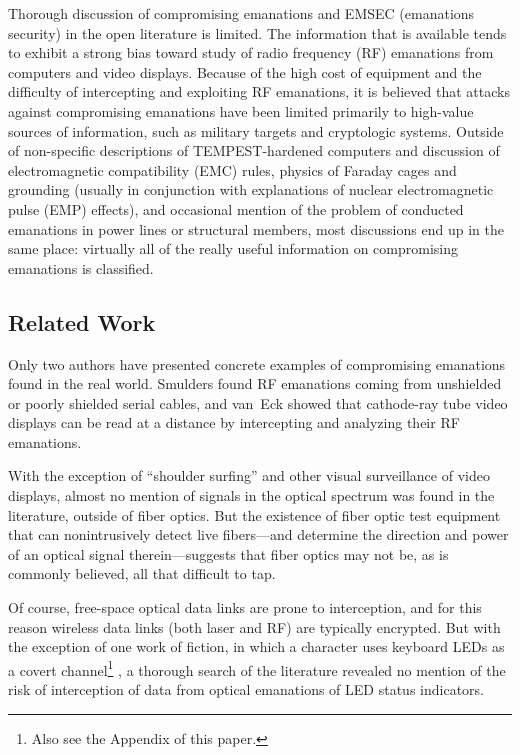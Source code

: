 \documentclass[twocolumn]{article}
\begin{document}
Thorough discussion of compromising emanations and EMSEC (emanations security) in the open literature is limited.  The information that is available tends to exhibit a strong bias toward study of radio frequency (RF) emanations from computers and video displays.  Because of the high cost of equipment and the difficulty of intercepting and exploiting RF emanations, it is believed that attacks against compromising emanations have been limited primarily to high-value sources of information, such as military targets and cryptologic systems.  Outside of non-specific descriptions of TEMPEST-hardened computers and discussion of electromagnetic compatibility (EMC) rules, physics of Faraday cages and grounding (usually in conjunction with explanations of nuclear electromagnetic pulse (EMP) effects), and occasional mention of the problem of conducted emanations in power lines or structural members, most discussions end up in the same place: virtually all of the really useful information on compromising emanations is classified.

\subsection{Related Work}

Only two authors have presented concrete examples of compromising emanations found in the real world.  Smulders found RF emanations coming from unshielded or poorly shielded serial cables, and van~Eck showed that cathode-ray tube video displays can be read at a distance by intercepting and analyzing their RF emanations. \cite{smulders, van_Eck}

With the exception of ``shoulder surfing'' and other visual surveillance of video displays, almost no mention of signals in the optical spectrum was found in the literature, outside of fiber optics.  But the existence of fiber optic test equipment that can nonintrusively detect live fibers---and determine the direction and power of an optical signal therein---suggests that fiber optics may not be, as is commonly believed, all that difficult to tap. \cite{exfo_data_sheet}

Of course, free-space optical data links are prone to interception, and for this reason wireless data links (both laser and RF) are typically encrypted.  But with the exception of one work of fiction, in which a character uses keyboard LEDs as a covert channel\footnote{Also see the Appendix of this paper.} \cite{cryptonomicon}, a thorough search of the literature revealed no mention of the risk of interception of data from optical emanations of LED status indicators.
\end{document}
